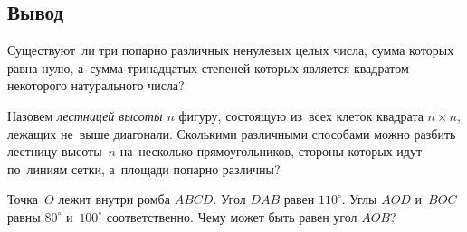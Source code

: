 




\subsection*{Вывод}

\begin{problems}

\item
Существуют~ли три попарно различных ненулевых целых числа, сумма которых равна
нулю, а~сумма тринадцатых степеней которых является квадратом некоторого
натурального числа?

\item
Назовем \emph{лестницей высоты $n$} фигуру, состоящую из~всех клеток
квадрата $n \times n$, лежащих не~выше диагонали.
Сколькими различными способами можно разбить лестницу высоты~$n$ на~несколько
прямоугольников, стороны которых идут по~линиям сетки, а~площади попарно
различны?

\item
Точка~$O$ лежит внутри ромба $ABCD$.
Угол $DAB$ равен $110^{\circ}$.
Углы $AOD$ и~$BOC$ равны $80^{\circ}$ и~$100^{\circ}$ соответственно.
Чему может быть равен угол $AOB$?


\end{problems}

